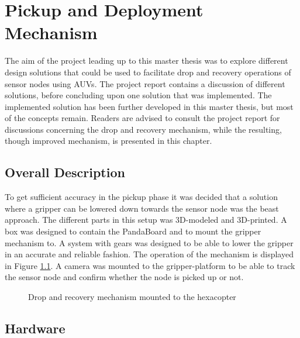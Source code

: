 \chapter{Pickup and Deployment Mechanism}
The aim of the project leading up to this master thesis was to explore different design solutions that could be used to facilitate drop and recovery operations of sensor nodes using AUVs. The project report \citep{prosjekt} contains a discussion of different solutions, before concluding upon one solution that was implemented. The implemented solution has been further developed in this master thesis, but most of the concepts remain. Readers are advised to consult the project report for discussions concerning the drop and recovery mechanism, while the resulting, though improved mechanism, is presented in this chapter.
\section{Overall Description}
To get sufficient accuracy in the pickup phase it was decided that a solution where a gripper can be lowered down towards the sensor node was the beast approach. The different parts in this setup was 3D-modeled and 3D-printed. A box was designed to contain the PandaBoard and to mount the gripper mechanism to. A system with gears was designed to be able to lower the gripper in an accurate and reliable fashion. The operation of the mechanism is displayed in Figure \ref{finished}. A camera was mounted to the gripper-platform to be able to track the sensor node and confirm whether the node is picked up or not.
\begin{figure}[H]
\centering
{}
\centering
{}
\caption{Drop and recovery mechanism mounted to the hexacopter}
\label{finished}
\end{figure}
\section{Hardware}
